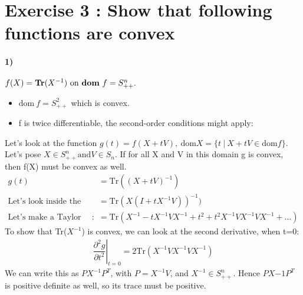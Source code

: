\documentclass[12pt,a4paper]{article}
\begin{document}
\section{Exercise 3 : Show that following functions are convex}
\paragraph{1)} $ f(X)=\text{\textbf{Tr}}(X^{-1})~\text{on \textbf{dom}}~f=S^n_{++}. $
\begin{itemize}
	\item $ \text{dom} ~f=S^2_{++} $ which is convex.
	\item f is twice differentiable, the second-order conditions might apply:\\
 \end{itemize}
 Let's look at the function $ g(t)=f(X+tV), ~\text{dom}X=\{t~|~X+tV \in \text{dom} f\}$.
 \\Let's pose $ X \in S^n_{++} \text{and} V \in S_n $. If for all X and V in this domain g is convex, 
 then f(X) must be convex as well.\\
\begin{align*}
	g(t) &= \text{Tr}((X+tV)^{-1})\\
	\text{Let's look inside the Trace :}~ &= \text{Tr}(X(I+tX^{-1}V))^{-1})\\
	\text{Let's make a Taylor expansion in t} : ~&= \text{Tr}(X^{-1}-tX^{-1}VX^{-1}+t^2 +t^2X^{-1}VX^{-1}VX^{-1} + \dots)
\end{align*}
To show that Tr($ X^{-1} $) is convex, we can look at the second derivative, when t=0:
\begin{align*}
	\left. \dfrac{\partial^2g}{\partial t^2} \right|_{t=0} = 2\text{Tr}(X^{-1}VX^{-1}VX^{-1})
\end{align*}
We can write this as $ PX^{-1}P^T $, with $ P=X^{-1}V $, and $ X^{-1} \in S^n_{++} $.
Hence $ PX{-1}P^T $ is positive definite as well, so its trace must be positive.\\
\end{document}

